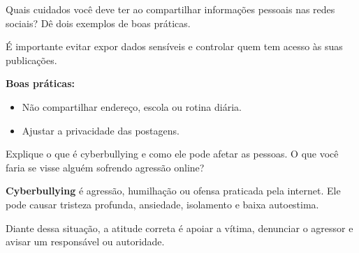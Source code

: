 \documentclass[11pt]{article}
\begin{document}

\begin{tcolorbox}[colback=blue!10,colframe=blue!60!black,
title=\textbf{Questão 3 – Privacidade nas Redes Sociais}]
Quais cuidados você deve ter ao compartilhar informações pessoais nas redes sociais?
Dê dois exemplos de boas práticas.
\end{tcolorbox}

\begin{tcolorbox}[colback=green!10,colframe=green!60!black,
title=\textbf{Solução 3 — Explicação }]
É importante evitar expor dados sensíveis e controlar quem tem acesso às suas publicações.

\textbf{Boas práticas:}
\begin{itemize}
\item Não compartilhar endereço, escola ou rotina diária.
\item Ajustar a privacidade das postagens.
\end{itemize}
\end{tcolorbox}


\begin{tcolorbox}[colback=blue!10,colframe=blue!60!black,
title=\textbf{Questão 4 – Cyberbullying}]
Explique o que é cyberbullying e como ele pode afetar as pessoas.  
O que você faria se visse alguém sofrendo agressão online?
\end{tcolorbox}

\begin{tcolorbox}[colback=green!10,colframe=green!60!black,
title=\textbf{Solução 4 — Explicação }]
\textbf{Cyberbullying} é agressão, humilhação ou ofensa praticada pela internet.
Ele pode causar tristeza profunda, ansiedade, isolamento e baixa autoestima.

Diante dessa situação, a atitude correta é apoiar a vítima, denunciar o agressor
e avisar um responsável ou autoridade.
\end{tcolorbox}

\end{document}
